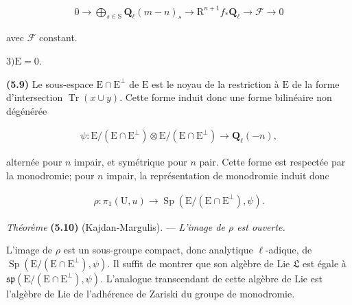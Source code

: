 \documentclass[10pt,leqno]{article}
\begin{document}
\begin{equation*}\begin{gathered}0 \longrightarrow  \bigoplus\limits_{s\in \mathrm{S}} \mathbf{Q}_{\ell }(m- n)_{s} \longrightarrow  \mathrm{R}^{n+1}f_{*}\mathbf{Q}_{\ell } \longrightarrow  \mathcal{F}  \longrightarrow  0\end{gathered}\end{equation*}

\noindent avec \(\mathcal{F} \) constant.\par

\noindent \(3) \mathrm{E}=0\).\par

\noindent \textbf{(5.9)} Le sous-espace \(\mathrm{E}\cap \mathrm{E}^{\perp }\) de \(\mathrm{E}\) est le noyau de la restriction à \(\mathrm{E}\) de la forme d’intersection \(\operatorname{Tr}(x\cup y)\). Cette forme induit donc une forme bilinéaire non dégénérée\par

\begin{equation*}\begin{gathered}\psi  : \mathrm{E}/(\mathrm{E}\cap \mathrm{E}^{\perp })\otimes \mathrm{E}/(\mathrm{E}\cap \mathrm{E}^{\perp }) \longrightarrow  \mathbf{Q}_{\ell }(- n),\end{gathered}\end{equation*}

\noindent alternée pour \(n\) impair, et symétrique pour \(n\) pair. Cette forme est respectée par la monodromie; pour \(n\) impair, la représentation de monodromie induit donc\par

\begin{equation*}\begin{gathered}\rho  : \pi _{1}(\mathrm{U},u) \longrightarrow  \operatorname{Sp}(\mathrm{E}/(\mathrm{E}\cap \mathrm{E}^{\perp }),\psi ).\end{gathered}\end{equation*}

\noindent \emph{Théorème} \textbf{(5.10)} (Kajdan-Margulis). — {\itshape L’image de \(\rho \) est ouverte.}\par

\noindent L’image de \(\rho \) est un sous-groupe compact, donc analytique \(\ell \)-adique, de \(\operatorname{Sp}(\mathrm{E}/(\mathrm{E}\cap \mathrm{E}^{\perp }),\psi )\). Il suffit de montrer que son algèbre de Lie \(\mathfrak{L} \) est égale à \(\mathfrak{sp}(\mathrm{E}/(\mathrm{E}\cap \mathrm{E}^{\perp }),\psi )\). L’analogue transcendant de cette algèbre de Lie est l’algèbre de Lie de l’adhérence de Zariski du groupe de monodromie.\par
\end{document}
